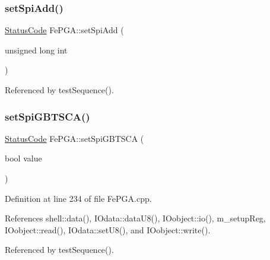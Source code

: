 \subsubsection{\texorpdfstring{set\+Spi\+Add()}{setSpiAdd()}}
{\footnotesize\ttfamily \hyperlink{classStatusCode}{Status\+Code} Fe\+P\+G\+A\+::set\+Spi\+Add (\begin{DoxyParamCaption}\item[{unsigned long}]{int }\end{DoxyParamCaption})}



Referenced by test\+Sequence().

\mbox{\label{classFePGA_a59b840619341df26918a6c26e8b8e72b}} 
\subsubsection{\texorpdfstring{set\+Spi\+G\+B\+T\+S\+C\+A()}{setSpiGBTSCA()}}
{\footnotesize\ttfamily \hyperlink{classStatusCode}{Status\+Code} Fe\+P\+G\+A\+::set\+Spi\+G\+B\+T\+S\+CA (\begin{DoxyParamCaption}\item[{bool}]{value }\end{DoxyParamCaption})}



Definition at line 234 of file Fe\+P\+G\+A.\+cpp.



References shell\+::data(), I\+Odata\+::data\+U8(), I\+Oobject\+::io(), m\+\_\+setup\+Reg, I\+Oobject\+::read(), I\+Odata\+::set\+U8(), and I\+Oobject\+::write().



Referenced by test\+Sequence().


